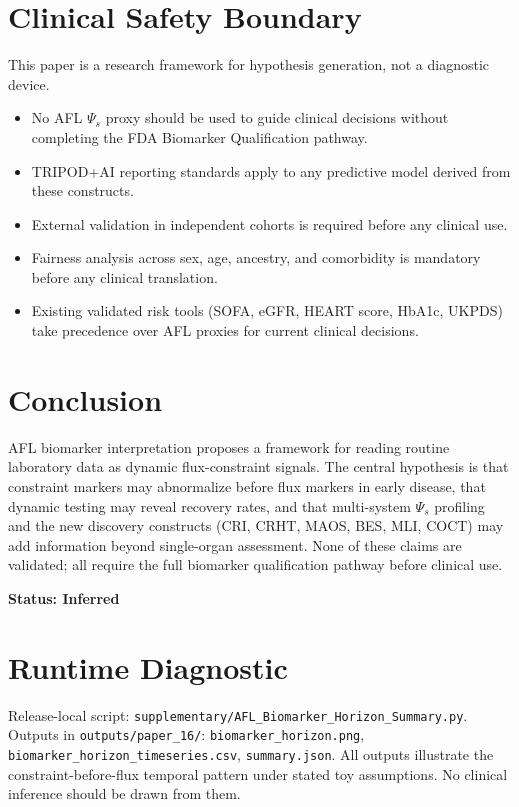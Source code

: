 \documentclass[12pt,a4paper]{article}
\begin{document}
\section{Clinical Safety Boundary}

This paper is a research framework for hypothesis generation, not a diagnostic device.
\begin{itemize}
    \item No AFL $\Psi_s$ proxy should be used to guide clinical decisions without completing the FDA Biomarker Qualification pathway.
    \item TRIPOD+AI reporting standards apply to any predictive model derived from these constructs.
    \item External validation in independent cohorts is required before any clinical use.
    \item Fairness analysis across sex, age, ancestry, and comorbidity is mandatory before any clinical translation.
    \item Existing validated risk tools (SOFA, eGFR, HEART score, HbA1c, UKPDS) take precedence over AFL proxies for current clinical decisions.
\end{itemize}

\section{Conclusion}

AFL biomarker interpretation proposes a framework for reading routine laboratory data as dynamic flux-constraint signals. The central hypothesis is that constraint markers may abnormalize before flux markers in early disease, that dynamic testing may reveal recovery rates, and that multi-system $\Psi_s$ profiling and the new discovery constructs (CRI, CRHT, MAOS, BES, MLI, COCT) may add information beyond single-organ assessment. None of these claims are validated; all require the full biomarker qualification pathway before clinical use.

\textbf{Status: Inferred}

\section{Runtime Diagnostic}

Release-local script: \texttt{supplementary/AFL\_Biomarker\_Horizon\_Summary.py}. Outputs in \texttt{outputs/paper\_16/}: \texttt{biomarker\_horizon.png}, \texttt{biomarker\_horizon\_timeseries.csv}, \texttt{summary.json}. All outputs illustrate the constraint-before-flux temporal pattern under stated toy assumptions. No clinical inference should be drawn from them.
\end{document}

